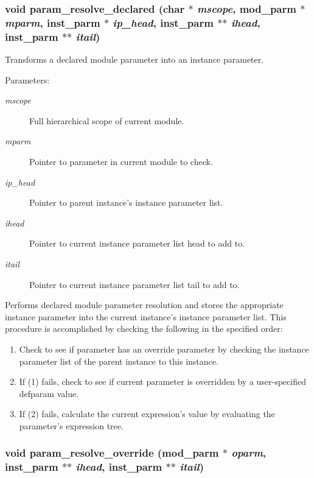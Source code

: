 \subsubsection{\setlength{\rightskip}{0pt plus 5cm}void param\_\-resolve\_\-declared (char $\ast$ {\em mscope}, {\bf mod\_\-parm} $\ast$ {\em mparm}, {\bf inst\_\-parm} $\ast$ {\em ip\_\-head}, {\bf inst\_\-parm} $\ast$$\ast$ {\em ihead}, {\bf inst\_\-parm} $\ast$$\ast$ {\em itail})}\label{param_8h_a9}


Transforms a declared module parameter into an instance parameter.

\begin{Desc}
\item[Parameters:]
\begin{description}
\item[{\em mscope}]Full hierarchical scope of current module. \item[{\em mparm}]Pointer to parameter in current module to check. \item[{\em ip\_\-head}]Pointer to parent instance's instance parameter list. \item[{\em ihead}]Pointer to current instance parameter list head to add to. \item[{\em itail}]Pointer to current instance parameter list tail to add to.\end{description}
\end{Desc}
Performs declared module parameter resolution and stores the appropriate instance parameter into the current instance's instance parameter list. This procedure is accomplished by checking the following in the specified order:\begin{enumerate}
\item Check to see if parameter has an override parameter by checking the instance parameter list of the parent instance to this instance.\item If (1) fails, check to see if current parameter is overridden by a user-specified defparam value.\item If (2) fails, calculate the current expression's value by evaluating the parameter's expression tree. \end{enumerate}
\subsubsection{\setlength{\rightskip}{0pt plus 5cm}void param\_\-resolve\_\-override ({\bf mod\_\-parm} $\ast$ {\em oparm}, {\bf inst\_\-parm} $\ast$$\ast$ {\em ihead}, {\bf inst\_\-parm} $\ast$$\ast$ {\em itail})}\label{param_8h_a10}


